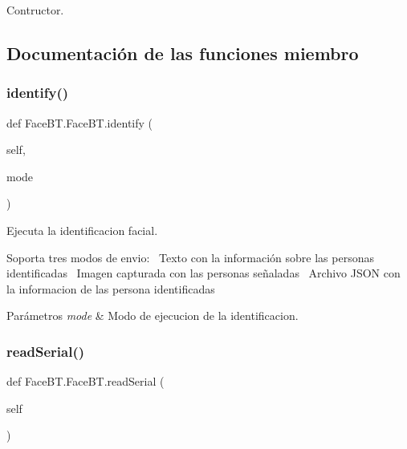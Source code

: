 Contructor. 



\subsection{Documentación de las funciones miembro}
\mbox{\label{class_face_b_t_1_1_face_b_t_a52e80d7d39f01c59794927eba5ff833d}} 
\subsubsection{\texorpdfstring{identify()}{identify()}}
{\footnotesize\ttfamily def Face\+B\+T.\+Face\+B\+T.\+identify (\begin{DoxyParamCaption}\item[{}]{self,  }\item[{}]{mode }\end{DoxyParamCaption})}



Ejecuta la identificacion facial. 

Soporta tres modos de envio\+:~\newline
 Texto con la información sobre las personas identificadas~\newline
 Imagen capturada con las personas señaladas~\newline
 Archivo J\+S\+ON con la informacion de las persona identificadas~\newline

\begin{DoxyParams}{Parámetros}
{\em mode} & Modo de ejecucion de la identificacion. \\
\hline
\end{DoxyParams}
\mbox{\label{class_face_b_t_1_1_face_b_t_af35d86c0311c080589128342dcb414a0}} 
\subsubsection{\texorpdfstring{read\+Serial()}{readSerial()}}
{\footnotesize\ttfamily def Face\+B\+T.\+Face\+B\+T.\+read\+Serial (\begin{DoxyParamCaption}\item[{}]{self }\end{DoxyParamCaption})}



